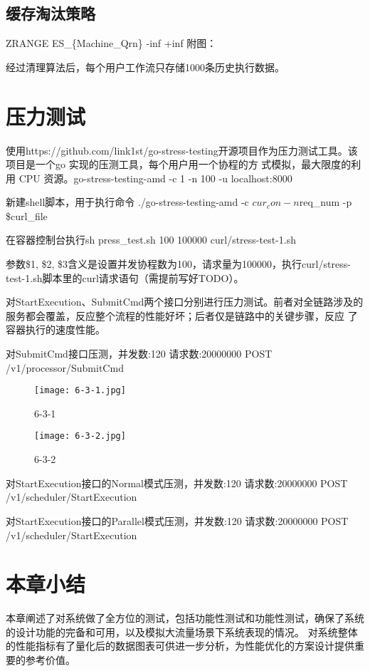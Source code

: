 \subsection{缓存淘汰策略}
ZRANGE ES\_\{Machine\_Qrn\} -inf +inf
附图：

经过清理算法后，每个用户工作流只存储1000条历史执行数据。


\section{压力测试}


使用https://github.com/link1st/go-stress-testing开源项目作为压力测试工具。该项目是一个go 实现的压测工具，每个用户用一个协程的方
式模拟，最大限度的利用 CPU 资源。go-stress-testing-amd -c 1 -n 100 -u localhost:8000

新建shell脚本，用于执行命令 ./go-stress-testing-amd -c $cur_con -n $req\_num -p \$curl\_file

在容器控制台执行sh press\_test.sh 100 100000 curl/stress-test-1.sh\cite{zw5}

参数\$1, \$2, \$3含义是设置并发协程数为100，请求量为100000，执行curl/stress-test-1.sh脚本里的curl请求语句（需提前写好TODO）。

对StartExecution、SubmitCmd两个接口分别进行压力测试。前者对全链路涉及的服务都会覆盖，反应整个流程的性能好坏；后者仅是链路中的关键步骤，反应
了容器执行的速度性能。


对SubmitCmd接口压测，并发数:120 请求数:20000000
POST /v1/processor/SubmitCmd

\begin{figure}[H]
    \centering
    \texttt{[image: 6-3-1.jpg]}
    \caption{6-3-1}
    \label{fig:6-3-1}
\end{figure}

\begin{figure}[H]
    \centering
    \texttt{[image: 6-3-2.jpg]}
    \caption{6-3-2}
    \label{fig:6-3-2}
\end{figure}

对StartExecution接口的Normal模式压测，并发数:120 请求数:20000000
POST /v1/scheduler/StartExecution

对StartExecution接口的Parallel模式压测，并发数:120 请求数:20000000
POST /v1/scheduler/StartExecution


\section{本章小结}

本章阐述了对系统做了全方位的测试，包括功能性测试和功能性测试，确保了系统的设计功能的完备和可用，以及模拟大流量场景下系统表现的情况。
对系统整体的性能指标有了量化后的数据图表可供进一步分析，为性能优化的方案设计提供重要的参考价值。
